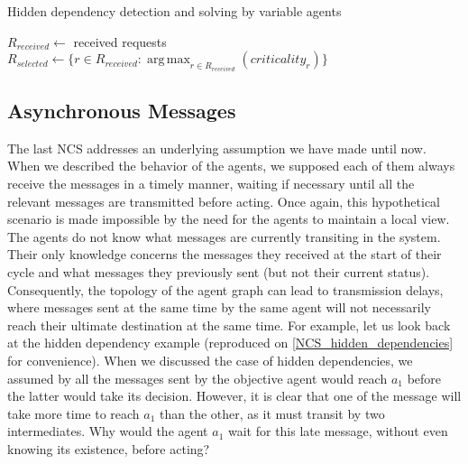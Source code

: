 \begin{algorithm}
\caption{Hidden dependency detection and solving by variable agents}
\label{algo_hidden_dependency_solving}

	$R_{received} \leftarrow $ { received requests}\;
	$R_{selected} \leftarrow \{ r \in R_{received} : \displaystyle\operatorname*{arg\,max}_{r \in R_{received}}(criticality_r) \}$\;


\end{algorithm}

\subsection{Asynchronous Messages}\label{NCS_async}

The last NCS addresses an underlying assumption we have made until now. When we described the behavior of the agents, we supposed each of them always receive the messages in a timely manner, waiting if necessary until all the relevant messages are transmitted before acting. Once again, this hypothetical scenario is made impossible by the need for the agents to maintain a local view. The agents do not know what messages are currently transiting in the system. Their only knowledge concerns the messages they received at the start of their cycle and what messages they previously sent (but not their current status). Consequently, the topology of the agent graph can lead to transmission delays, where messages sent at the same time by the same agent will not necessarily reach their ultimate destination at the same time. For example, let us look back at the hidden dependency example (reproduced on \figurename{} \ref{NCS_hidden_dependencies} for convenience). When we discussed the case of hidden dependencies, we assumed by all the messages sent by the objective agent would reach $a_1$ before the latter would take its decision. However, it is clear that one of the message will take more time to reach $a_1$ than the other, as it must transit by two intermediates. Why would the agent $a_1$ wait for this late message, without even knowing its existence, before acting?

